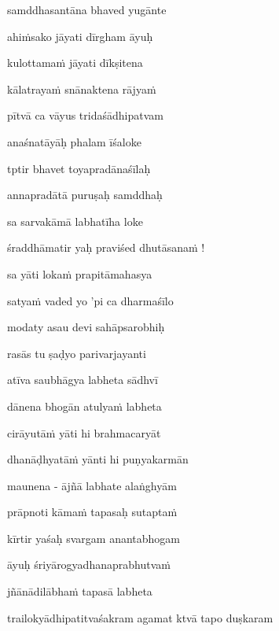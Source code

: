 \nemslokad 
samddhasantāna bhaved yugānte \veg\dontdisplaylinenum

\ujvers\nemsloka 
ahi\.msako jāyati dīrgham āyuḥ
\dontdisplaylinenum

\nemslokab 
kulottama\.m jāyati dīkṣitena \danda\dontdisplaylinenum

\nemslokac 
kālatraya\.m snānaktena rājya\.m
\dontdisplaylinenum

\nemslokad 
pītvā ca vāyus tridaśādhipatvam \veg\dontdisplaylinenum

\ujvers\nemsloka 
anaśnatāyāḥ phalam īśaloke
\dontdisplaylinenum

\nemslokab 
tptir bhavet toyapradānaśīlaḥ \danda\dontdisplaylinenum

\nemslokac 
annapradātā puruṣaḥ samddhaḥ
\dontdisplaylinenum

\nemslokad 
sa sarvakāmā labhatīha loke \veg\dontdisplaylinenum

\ujvers\nemsloka 
śraddhāmatir yaḥ praviśed dhutāsana\.m !
\dontdisplaylinenum

\nemslokab 
sa yāti loka\.m prapitāmahasya \danda\dontdisplaylinenum

\nemslokac 
satya\.m vaded yo 'pi ca dharmaśīlo
\dontdisplaylinenum

\nemslokad 
modaty asau devi sahāpsarobhiḥ \veg\dontdisplaylinenum

\ujvers\nemsloka 
rasās tu ṣaḍyo parivarjayanti
\dontdisplaylinenum

\nemslokab 
atīva saubhāgya labheta sādhvī \danda\dontdisplaylinenum

\nemslokac 
dānena bhogān atulya\.m labheta
\dontdisplaylinenum

\nemslokad 
cirāyutā\.m yāti hi brahmacaryāt \veg\dontdisplaylinenum

\ujvers\nemsloka 
dhanāḍhyatā\.m yānti hi puṇyakarmān
\dontdisplaylinenum

\nemslokab 
maunena - ājñā labhate alaṅghyām \danda\dontdisplaylinenum

\nemslokac 
prāpnoti kāma\.m tapasaḥ sutapta\.m
\dontdisplaylinenum

\nemslokad 
kīrtir yaśaḥ svargam anantabhogam \veg\dontdisplaylinenum

\ujvers\nemsloka 
āyuḥ śriyārogyadhanaprabhutva\.m
\dontdisplaylinenum

\nemslokab 
jñānādilābha\.m tapasā labheta \danda\dontdisplaylinenum

\ujvers\nemsloka 
trailokyādhipatitvaśakram agamat ktvā tapo duṣkaram
\dontdisplaylinenum


